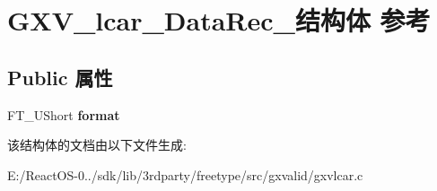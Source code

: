 \hypertarget{struct_g_x_v__lcar___data_rec__}{}\section{G\+X\+V\+\_\+lcar\+\_\+\+Data\+Rec\+\_\+结构体 参考}
\label{struct_g_x_v__lcar___data_rec__}
\subsection*{Public 属性}
\begin{DoxyCompactItemize}
\item 
\mbox{\label{struct_g_x_v__lcar___data_rec___a3346c0aaf55d0f754c28c8acc013841b}} 
F\+T\+\_\+\+U\+Short {\bfseries format}
\end{DoxyCompactItemize}


该结构体的文档由以下文件生成\+:\begin{DoxyCompactItemize}
\item 
E\+:/\+React\+O\+S-\/0../sdk/lib/3rdparty/freetype/src/gxvalid/gxvlcar.\+c\end{DoxyCompactItemize}

